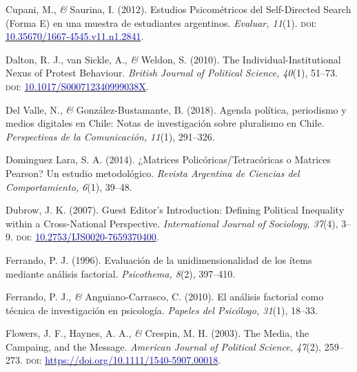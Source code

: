 \documentclass[a4paper]{tufte-handout}
\begin{document}
\begin{list}{}
\item{\small Cupani, M., {\itshape \&} Saurina, I. (2012). Estudios Psicométricos del Self-Directed Search (Forma E) en una muestra de estudiantes argentinos. {\itshape Evaluar, 11}(1). {\scshape doi:} \href{https://doi.org/10.35670/1667-4545.v11.n1.2841}{\textcolor{blue}{10.35670/1667-4545.v11.n1.2841}}.}

\item{\small Dalton, R. J., van Sickle, A., {\itshape \&} Weldon, S. (2010). The Individual-Institutional Nexus of Protest Behaviour. {\itshape British Journal of Political Science, 40}(1), 51--73. {\scshape doi:} \href{https://doi.org/10.1017/S000712340999038X}{\textcolor{blue}{10.1017/S000712340999038X}}.}

\item{\small Del Valle, N., {\itshape \&} González-Bustamante, B. (2018). Agenda política, periodismo y medios digitales en Chile: Notas de investigación sobre pluralismo en Chile. {\itshape Perspectivas de la Comunicación, 11}(1), 291--326.}

\item{\small Dominguez Lara, S. A. (2014). ¿Matrices Policóricas/Tetracóricas o Matrices Pearson? Un estudio metodológico. {\itshape Revista Argentina de Ciencias del Comportamiento, 6}(1), 39--48.}

\item{\small Dubrow, J. K. (2007). Guest Editor’s Introduction: Defining Political Inequality within a Cross-National Perspective. {\itshape International Journal of Sociology, 37}(4), 3--9. {\scshape doi:} \href{https://doi.org/10.2753/IJS0020-7659370400}{\textcolor{blue}{10.2753/IJS0020-7659370400}}.}

\item{\small Ferrando, P. J. (1996). Evaluación de la unidimensionalidad de los ítems mediante análisis factorial. {\itshape Psicothema, 8}(2), 397--410.}

\item{\small Ferrando, P. J., {\itshape \&} Anguiano-Carrasco, C. (2010). El análisis factorial como técnica de investigación en psicología. {\itshape Papeles del Psicólogo, 31}(1), 18--33.}

\item{\small Flowers, J. F., Haynes, A. A., {\itshape \&} Crespin, M. H. (2003). The Media, the Campaing, and the Message. {\itshape American Journal of Political Science, 47}(2), 259--273. {\scshape doi:} \href{https://doi.org/10.1111/1540-5907.00018}{\textcolor{blue}{https://doi.org/10.1111/1540-5907.00018}}.}


\end{list}
\end{document}

